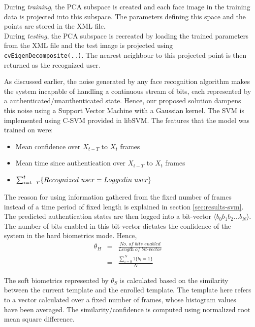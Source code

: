 \documentclass[%
        final,
        internal,
        notitlepage,
        narroweqnarray,
        inline,
        ]{ieee}
\begin{document}
During \emph{training}, the PCA subspace is created and each face image in the training data is projected into this subspace.
The parameters defining this space and the points are stored in the XML file.\\
During \emph{testing}, the PCA subspace is recreated by loading the trained parameters from the XML file and the test image is projected using \verb+cvEigenDecomposite(..)+.
The nearest neighbour to this projected point is then returned as the recognized user.

As discussed earlier, the noise generated by any face recognition algorithm makes the system incapable of handling a continuous stream of bits, each represented by a authenticated/unauthenticated state.
Hence, our proposed solution dampens this noise using a Support Vector Machine with a Gaussian kernel.
The SVM is implemented using C-SVM provided in libSVM\cite{libsvm}.
The features that the model was trained on were:
\begin{itemize}
	\item Mean confidence over $X_{t-T}$ to $X_{t}$ frames
	\item Mean time since authentication over $X_{t-T}$ to $X_{t}$ frames
	\item $\sum_{i=t-T}^{t}\{Recognized\ user = Logged\-in\ user\}$
\end{itemize}
The reason for using information gathered from the fixed number of frames instead of a time period of fixed length is explained in section \ref{sec:results-svm}.
The predicted authentication states are then logged into a bit-vector $\langle b_0 b_1 b_2 \ldots b_N \rangle$.
The number of bits enabled in this bit-vector dictates the confidence of the system in the hard biometrics mode.
Hence,
\begin{eqnarray}
\theta_{H} & = & \frac {\textit{No. of bits enabled}} {\textit{Length of bit-vector}}\\
           & = & \frac{\sum_{i=0}^{N} 1\{b_i=1\}}{N}
\end{eqnarray}

The soft biometrics represented by $\theta_{S}$ is calculated based on the similarity between the current template and the enrolled template.
The template here refers to a vector calculated over a fixed number of frames, whose histogram values have been averaged.
The similarity/confidence is computed using normalized root mean square difference.
 
\end{document}
